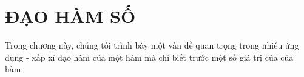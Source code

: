 \chapter{ĐẠO HÀM SỐ}

Trong chương này, chúng tôi trình bày một vấn đề quan trọng trong nhiều ứng dụng - xấp xỉ đạo hàm của một hàm mà chỉ biết trước một số giá trị của của hàm.

